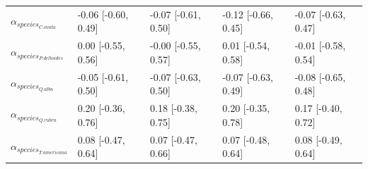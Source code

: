 \begin{table}[ht]
\begin{tabular}{lllll}
  $\alpha_{species_{C. ovata}}$ & -0.06 [-0.60, 0.49] & -0.07 [-0.61, 0.50] & -0.12 [-0.66, 0.45] & -0.07 [-0.63, 0.47] \\ 
  $\alpha_{species_{P. deltoides}}$ & 0.00 [-0.55, 0.56] & -0.00 [-0.55, 0.57] & 0.01 [-0.54, 0.58] & -0.01 [-0.58, 0.54] \\ 
  $\alpha_{species_{Q. alba}}$ & -0.05 [-0.61, 0.50] & -0.07 [-0.63, 0.50] & -0.07 [-0.63, 0.49] & -0.08 [-0.65, 0.48] \\ 
  $\alpha_{species_{Q. rubra}}$ & 0.20 [-0.36, 0.76] & 0.18 [-0.38, 0.75] & 0.20 [-0.35, 0.78] & 0.17 [-0.40, 0.72] \\ 
  $\alpha_{species_{T. americana}}$ & 0.08 [-0.47, 0.64] & 0.07 [-0.47, 0.66] & 0.07 [-0.48, 0.64] & 0.08 [-0.49, 0.64] \\ 
   \hline
\end{tabular}
\end{table}


